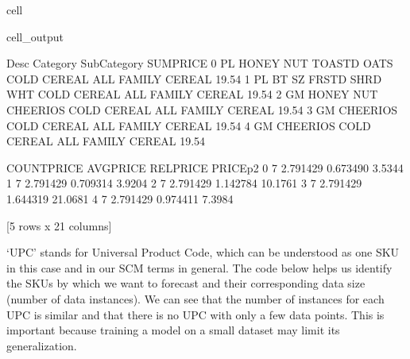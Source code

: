\documentclass[letterpaper,10pt,english]{jupyterBook}
\begin{document}
\begin{sphinxuseclass}{cell}
\begin{sphinxVerbatimOutput}
\begin{sphinxuseclass}{cell_output}
\begin{sphinxVerbatim}[commandchars=\\\{\}]
                       Desc     Category       Sub\PYGZhy{}Category SUMPRICE  \PYGZbs{}
0  PL HONEY NUT TOASTD OATS  COLD CEREAL  ALL FAMILY CEREAL    19.54   
1   PL BT SZ FRSTD SHRD WHT  COLD CEREAL  ALL FAMILY CEREAL    19.54   
2     GM HONEY NUT CHEERIOS  COLD CEREAL  ALL FAMILY CEREAL    19.54   
3               GM CHEERIOS  COLD CEREAL  ALL FAMILY CEREAL    19.54   
4               GM CHEERIOS  COLD CEREAL  ALL FAMILY CEREAL    19.54   

   COUNTPRICE  AVGPRICE  RELPRICE  PRICE\PYGZus{}p2  
0           7  2.791429  0.673490    3.5344  
1           7  2.791429  0.709314    3.9204  
2           7  2.791429  1.142784   10.1761  
3           7  2.791429  1.644319   21.0681  
4           7  2.791429  0.974411    7.3984  

[5 rows x 21 columns]
\end{sphinxVerbatim}

\end{sphinxuseclass}\end{sphinxVerbatimOutput}

\end{sphinxuseclass}
\sphinxAtStartPar
‘UPC’ stands for Universal Product Code, which can be understood as one SKU in this case and in our SCM terms in general. The code below helps us identify the SKUs by which we want to forecast and their corresponding data size (number of data instances). We can see that the number of instances for each UPC is similar and that there is no UPC with only a few data points. This is important because training a model on a small dataset may limit its generalization.
\end{document}
